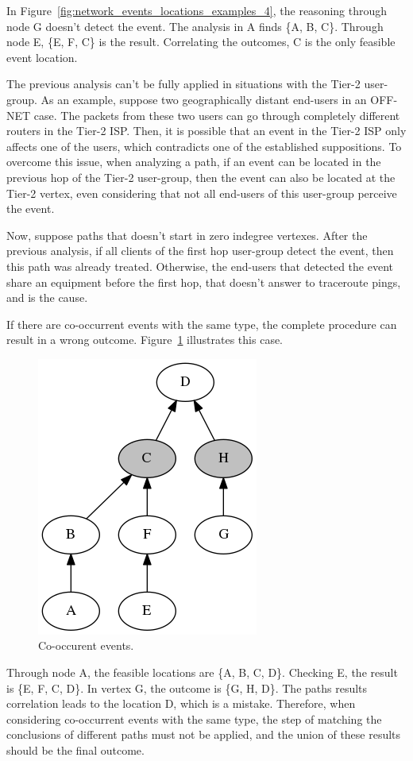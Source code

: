 In Figure~\ref{fig:network_events_locations_examples_4}, the reasoning through
node G doesn't detect the event. The analysis in A finds \{A, B, C\}. Through
node E, \{E, F, C\} is the result.
Correlating the outcomes, C is the only feasible event location.

The previous analysis can't be fully applied in situations with the Tier-2
user-group.
As an example, suppose two geographically distant end-users in an OFF-NET case.
The packets from these two users can go through completely different routers in
the Tier-2 ISP\@. Then, it is possible that an event in the Tier-2 ISP only
affects one of the users, which contradicts one of the established suppositions.
To overcome this issue, when analyzing a path, if an event can be located in the
previous hop of the Tier-2 user-group, then the event can also be located at
the Tier-2 vertex, even considering that not all end-users of this user-group
perceive the event.

Now, suppose paths that doesn't start in zero indegree vertexes.
After the previous analysis,
if all clients of the first hop user-group detect the event, then this
path was already treated. Otherwise, the end-users that detected the event
share an equipment before the first hop,
that doesn't answer to traceroute pings, and is the cause.

If there are co-occurrent events with the same type, the complete procedure can
result in a wrong outcome. Figure~\ref{fig:network_events_locations_examples_5}
illustrates this case.

\begin{figure}[H]
    \centering
    \includegraphics[width=0.35\linewidth]{./figures/methodology/spatial_time_correlation/event_tree_graph_5.png}
    \caption{Co-occurent events.}
\label{fig:network_events_locations_examples_5}
\end{figure}%

Through node A, the feasible locations are \{A, B, C, D\}.
Checking E, the result is \{E, F, C, D\}.
In vertex G, the outcome is \{G, H, D\}.
The paths results correlation leads to the location D, which is a mistake.
Therefore, when considering co-occurrent events with the same type, the step of
matching the conclusions of different paths must not be applied, and the
union of these results should be the final outcome.

